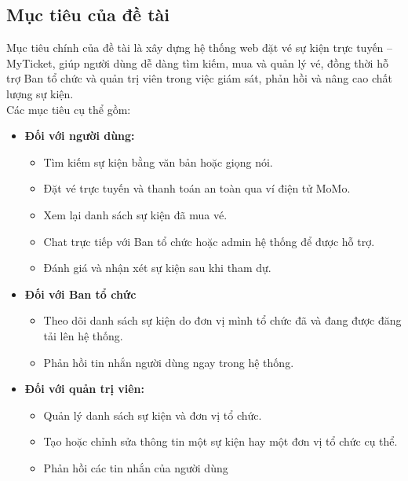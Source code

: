 \subsection{Mục tiêu của đề tài}
\indent \indent Mục tiêu chính của đề tài là xây dựng hệ thống web đặt vé sự kiện trực tuyến – MyTicket, giúp người dùng dễ dàng tìm kiếm, mua và quản lý vé, đồng thời hỗ trợ Ban tổ chức và quản trị viên trong việc giám sát, phản hồi và nâng cao chất lượng sự kiện.\\
\indent Các mục tiêu cụ thể gồm:
\begin{itemize}
    \item[1.] \textbf{Đối với người dùng:}
    \begin{itemize}
        \item[-] Tìm kiếm sự kiện bằng văn bản hoặc giọng nói.
        \item[-] Đặt vé trực tuyến và thanh toán an toàn qua ví điện tử MoMo.
        \item[-] Xem lại danh sách sự kiện đã mua vé.
        \item[-] Chat trực tiếp với Ban tổ chức hoặc admin hệ thống để được hỗ trợ.
        \item[-] Đánh giá và nhận xét sự kiện sau khi tham dự.
    \end{itemize}
    \item[2.] \textbf{Đối với Ban tổ chức}
    \begin{itemize}
        \item[-] Theo dõi danh sách sự kiện do đơn vị mình tổ chức đã và đang được đăng tải lên hệ thống.
        \item[-] Phản hồi tin nhắn người dùng ngay trong hệ thống.
    \end{itemize}
    \item[3.] \textbf{Đối với quản trị viên:}
    \begin{itemize}
        \item[-] Quản lý danh sách sự kiện và đơn vị tổ chức.
        \item[-] Tạo hoặc chỉnh sửa thông tin một sự kiện hay một đơn vị tổ chức cụ thể.
        \item[-] Phản hồi các tin nhắn của người dùng
    \end{itemize}
\end{itemize}
